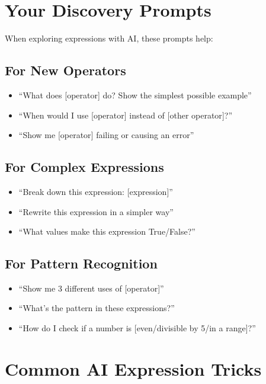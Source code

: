 \documentclass[
  letterpaper,
  DIV=11,
  numbers=noendperiod,
  oneside]{scrreprt}
\providecommand{\tightlist}{%
  \setlength{\itemsep}{0pt}\setlength{\parskip}{0pt}}\usepackage{longtable,booktabs,array}
\begin{document}
\section{Your Discovery Prompts}\label{your-discovery-prompts}

When exploring expressions with AI, these prompts help:

\subsection{For New Operators}\label{for-new-operators}

\begin{itemize}
\tightlist
\item
  ``What does {[}operator{]} do? Show the simplest possible example''
\item
  ``When would I use {[}operator{]} instead of {[}other operator{]}?''
\item
  ``Show me {[}operator{]} failing or causing an error''
\end{itemize}

\subsection{For Complex Expressions}\label{for-complex-expressions}

\begin{itemize}
\tightlist
\item
  ``Break down this expression: {[}expression{]}''
\item
  ``Rewrite this expression in a simpler way''
\item
  ``What values make this expression True/False?''
\end{itemize}

\subsection{For Pattern Recognition}\label{for-pattern-recognition}

\begin{itemize}
\tightlist
\item
  ``Show me 3 different uses of {[}operator{]}''
\item
  ``What's the pattern in these expressions?''
\item
  ``How do I check if a number is {[}even/divisible by 5/in a
  range{]}?''
\end{itemize}

\section{Common AI Expression Tricks}\label{common-ai-expression-tricks}
\end{document}
